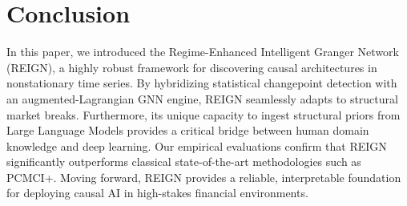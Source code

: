 \section{Conclusion}

In this paper, we introduced the Regime-Enhanced Intelligent Granger Network (REIGN), a highly robust framework for discovering causal architectures in nonstationary time series. By hybridizing statistical changepoint detection with an augmented-Lagrangian GNN engine, REIGN seamlessly adapts to structural market breaks. Furthermore, its unique capacity to ingest structural priors from Large Language Models provides a critical bridge between human domain knowledge and deep learning. Our empirical evaluations confirm that REIGN significantly outperforms classical state-of-the-art methodologies such as PCMCI+. Moving forward, REIGN provides a reliable, interpretable foundation for deploying causal AI in high-stakes financial environments.
